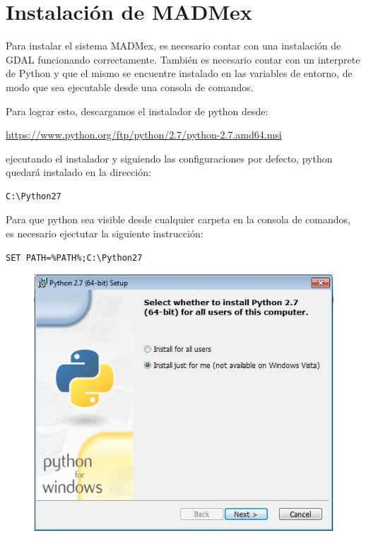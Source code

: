 \documentclass[11pt, spanish]{memoir}
\begin{document}
\chapter{Instalación de MADMex}
Para instalar el sistema MADMex, es necesario contar con una instalación de GDAL funcionando correctamente. También es necesario contar con un interprete de Python y que el mismo se encuentre instalado en las variables de entorno, de modo que sea ejecutable desde una consola de comandos.

Para lograr esto, descargamos el instalador de python desde:

\url{https://www.python.org/ftp/python/2.7/python-2.7.amd64.msi}

ejecutando el instalador y siguiendo las configuraciones por defecto, python quedará instalado en la dirección:


\begin{lstlisting} 
C:\Python27
\end{lstlisting}

Para que python sea visible desde cualquier carpeta en la consola de comandos, es necesario ejectutar la siguiente instrucción:

\begin{lstlisting} 
SET PATH=%PATH%;C:\Python27
\end{lstlisting}

\begin{figure}[H]
\centering
\includegraphics[width=14cm]{python2.png}
\end{figure}
\end{document}
